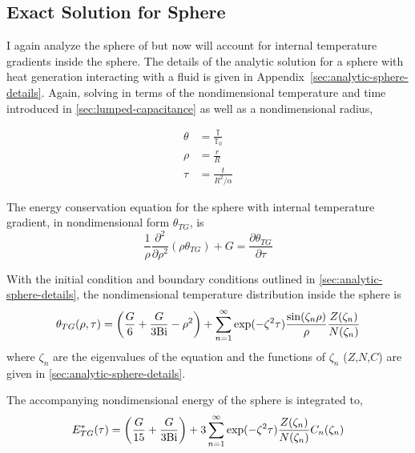 \subsection{Exact Solution for Sphere}\label{sec:analytic-sphere}

I again analyze the sphere of  but now will account for internal temperature gradients inside the sphere. The details of the analytic solution for a sphere with heat generation interacting with a fluid is given in Appendix~\ref{sec:analytic-sphere-details}. Again, solving in terms of the nondimensional temperature and time introduced in \cref{sec:lumped-capacitance} as well as a nondimensional radius,

\begin{align*}
    \theta &= \frac{\mathbb{T}}{\mathbb{T}_0}\\
    \rho & = \frac{r}{R}\\
    \tau & = \frac{t}{R^2/\alpha}
\end{align*}

The energy conservation equation for the sphere with internal temperature gradient, in nondimensional form $\theta_{TG}$, is
\begin{equation}
    \frac{1}{\rho}\frac{\partial^2}{\partial \rho^2}(\rho\theta_{TG}) + G = \frac{\partial\theta_{TG}}{\partial \tau}
\end{equation}

With the initial condition and boundary conditions outlined in \cref{sec:analytic-sphere-details}, the nondimensional temperature distribution inside the sphere is 
\begin{equation}\label{eq:analytic-temperature-distribution}
    \theta_{TG}(\rho,\tau) = \left(\frac{G}{6} + \frac{G}{3\mathrm{Bi}}-\rho^2\right)  +   \sum_{n=1}^\infty \exp(-\zeta^2 \tau) \frac{\sin(\zeta_n \rho)}{\rho} \frac{Z(\zeta_n)}{N(\zeta_n)}  
\end{equation}
where $\zeta_n$ are the eigenvalues of the equation and the functions of $\zeta_n$ ($Z$,$N$,$C$) are given in \cref{sec:analytic-sphere-details}.

The accompanying nondimensional energy of the sphere is integrated to,
\begin{equation}
\label{eq:analytic-energy-profile}
    E^*_{TG}(\tau)=\left(\frac{G}{15}+\frac{G}{3\mathrm{Bi}}\right)+3\sum_{n=1}^\infty \exp(-\zeta^2 \tau) \frac{Z(\zeta_n)}{N(\zeta_n)} C_n(\zeta_n)
\end{equation}


